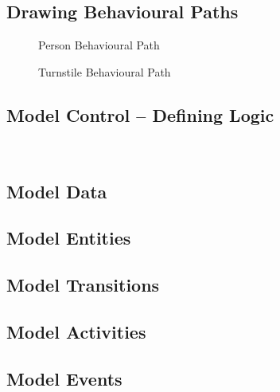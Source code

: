 \documentclass[]{article}
\begin{document}
\vspace*{16pt}

\newpage

\subsection*{Drawing Behavioural Paths}

\begin{figure}[htp]
\caption{Person Behavioural Path}
\vspace*{160pt}
\end{figure}

\begin{figure}[htp]
\caption{Turnstile Behavioural Path}
\end{figure}

\subsection*{Model Control -- Defining Logic}

 \\[6pt]
 \newpage


\subsection*{Model Data}



\subsection*{Model Entities}



\vspace*{-16pt}

\subsection*{Model Transitions}



\subsection*{Model Activities}



\subsection*{Model Events}


\end{document}
